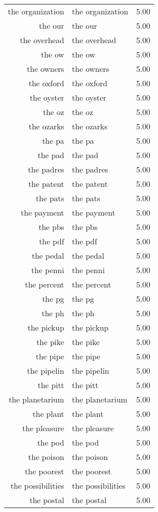 \begin{table}[ht]
\begin{tabular}{rlr}
  the organization & the organization & 5.00 \\ 
  the our & the our & 5.00 \\ 
  the overhead & the overhead & 5.00 \\ 
  the ow & the ow & 5.00 \\ 
  the owners & the owners & 5.00 \\ 
  the oxford & the oxford & 5.00 \\ 
  the oyster & the oyster & 5.00 \\ 
  the oz & the oz & 5.00 \\ 
  the ozarks & the ozarks & 5.00 \\ 
  the pa & the pa & 5.00 \\ 
  the pad & the pad & 5.00 \\ 
  the padres & the padres & 5.00 \\ 
  the patent & the patent & 5.00 \\ 
  the pats & the pats & 5.00 \\ 
  the payment & the payment & 5.00 \\ 
  the pbs & the pbs & 5.00 \\ 
  the pdf & the pdf & 5.00 \\ 
  the pedal & the pedal & 5.00 \\ 
  the penni & the penni & 5.00 \\ 
  the percent & the percent & 5.00 \\ 
  the pg & the pg & 5.00 \\ 
  the ph & the ph & 5.00 \\ 
  the pickup & the pickup & 5.00 \\ 
  the pike & the pike & 5.00 \\ 
  the pipe & the pipe & 5.00 \\ 
  the pipelin & the pipelin & 5.00 \\ 
  the pitt & the pitt & 5.00 \\ 
  the planetarium & the planetarium & 5.00 \\ 
  the plant & the plant & 5.00 \\ 
  the pleasure & the pleasure & 5.00 \\ 
  the pod & the pod & 5.00 \\ 
  the poison & the poison & 5.00 \\ 
  the poorest & the poorest & 5.00 \\ 
  the possibilities & the possibilities & 5.00 \\ 
  the postal & the postal & 5.00 \\ 

\end{tabular}
\end{table}
